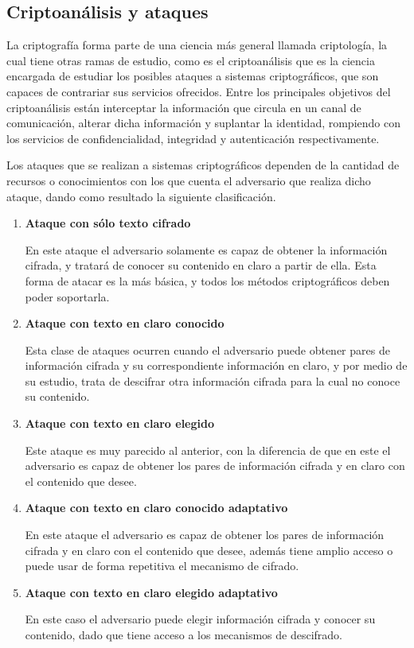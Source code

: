 
\subsection{Criptoanálisis y ataques}

  La criptografía forma parte de una ciencia más general llamada criptología, 
  la cual tiene otras ramas de estudio, como es el criptoanálisis que es la 
  ciencia encargada de estudiar los posibles ataques a sistemas criptográficos, 
  que son capaces de contrariar sus servicios ofrecidos. Entre los principales 
  objetivos del criptoanálisis están interceptar la información que circula 
  en un canal de comunicación, alterar dicha información y suplantar la 
  identidad, rompiendo con los servicios de confidencialidad, integridad y 
  autenticación respectivamente.

  Los ataques que se realizan a sistemas criptográficos dependen de la cantidad 
  de recursos o conocimientos con los que cuenta el adversario que realiza dicho 
  ataque, dando como resultado la siguiente clasificación.

  \begin{enumerate}
 
    \item \textbf{Ataque con sólo texto cifrado}

      En este ataque el adversario solamente es capaz de obtener la información
      cifrada, y tratará de conocer su contenido en claro a partir de ella.
      Esta forma de atacar es la más básica, y todos los métodos
      criptográficos deben poder soportarla.

    \item \textbf{Ataque con texto en claro conocido}

      Esta clase de ataques ocurren cuando el adversario puede obtener pares
      de información cifrada y su correspondiente información en claro, y
      por medio de su estudio, trata de descifrar otra información cifrada
      para la cual no conoce su contenido.

    \item \textbf{Ataque con texto en claro elegido}

      Este ataque es muy parecido al anterior, con la diferencia de que en
      este el adversario es capaz de obtener los pares de información
      cifrada y en claro con el contenido que desee.

    \item \textbf{Ataque con texto en claro conocido adaptativo}

      En este ataque el adversario es capaz de obtener los pares de
      información cifrada y en claro con el contenido que desee, además
      tiene amplio acceso o puede usar de forma repetitiva el mecanismo de
      cifrado.

    \item \textbf{Ataque con texto en claro elegido adaptativo}

      En este caso el adversario puede elegir información cifrada y conocer
      su contenido, dado que tiene acceso a los mecanismos de descifrado.

  \end{enumerate}
